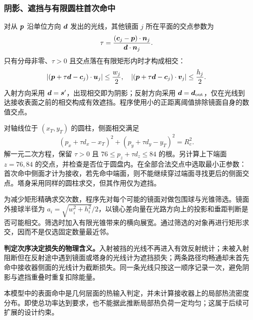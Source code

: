 \pagepart
\subsubsection{阴影、遮挡与有限圆柱首次命中}
对从 $\bm{p}$ 沿单位方向 $\bm{d}$ 发出的光线，其他镜面 $j$ 所在平面的交点参数为
\begin{equation}
\tau=\frac{(\bm{c}_j-\bm{p})\cdot\bm{n}_j}{\bm{d}\cdot\bm{n}_j}.
\end{equation}
只有分母非零、$\tau>0$ 且交点落在有限矩形内时才构成相交：
\begin{equation}
\left|(\bm{p}+\tau\bm{d}-\bm{c}_j)\cdot\bm{u}_j\right|\le\frac{w_j}{2},\quad
\left|(\bm{p}+\tau\bm{d}-\bm{c}_j)\cdot\bm{v}_j\right|\le\frac{h_j}{2}.
\end{equation}
入射方向采用 $\bm{d}=\bm{s}'$，出现相交即为阴影；反射方向采用 $\bm{d}=\bm{d}_{\rm out}$，仅在光线到达接收表面之前的相交构成有效遮挡。程序使用小的正距离阈值排除镜面自身的数值交点。

对轴线位于 $(x_T,y_T)$ 的圆柱，侧面相交满足
\begin{equation}
(p_x+\tau d_x-x_T)^2+(p_y+\tau d_y-y_T)^2=R_c^2.
\end{equation}
解一元二次方程，保留 $\tau>0$ 且 $76\le p_z+\tau d_z\le84$ 的根。另计算上下端面 $z=76,84$ 的交点，并检查是否位于圆盘内。在全部合法交点中选取最小正参数：首次命中侧面才计为接收，若先命中端面，则不能继续穿过端面寻找更后的侧面交点。塔身采用同样的圆柱求交，但其作用仅为遮挡。

为减少矩形精确求交次数，程序先对每个可能的镜面对做包围球与光锥筛选。镜面外接球半径为 $a_i=\sqrt{w_i^2+h_i^2}/2$，以镜心差向量在光路方向上的投影和垂距判断是否可能相交。筛选时加入有限光锥带来的横向展宽。通过筛选的对象再进行矩形求交，因而不是仅选固定数量最近邻。

\textbf{判定次序决定损失的物理含义。}入射被挡的光线不再进入有效反射统计；未被入射阻断但在反射途中遇到镜面或塔身的光线计为遮挡损失；两条路径均畅通却未首先命中接收器侧面的光线计为截断损失。同一条光线只按这一顺序记录一次，避免阴影与遮挡重叠时重复扣除能量。

本模型中的表面命中是几何层面的热输入判定，并未计算接收器上的局部热流密度分布。即使总功率达到要求，也不能据此推断局部热负荷一定均匀；这属于后续可扩展的设计约束。

\pagepart
